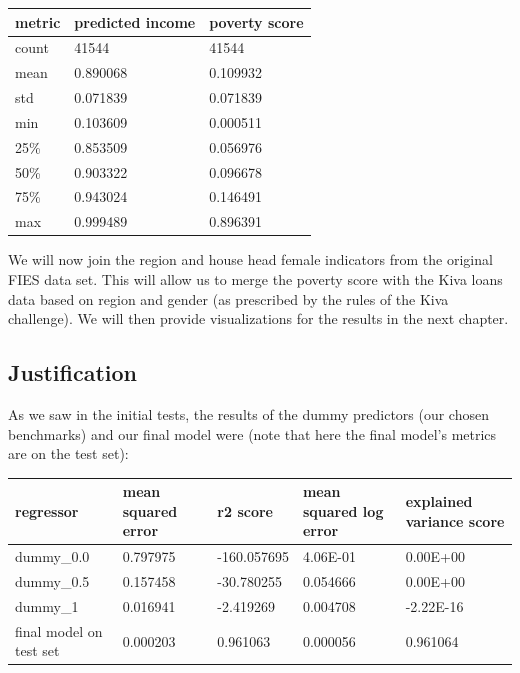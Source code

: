 \documentclass{article}
\begin{document}
\begin{center}
\begin{tabular}{ |l|l|l| }
  \hline
  metric &  predicted income & poverty score\\
  \hline
  count & 41544 & 41544\\
  mean & 0.890068 & 0.109932\\
  std & 0.071839 & 0.071839\\
  min & 0.103609 & 0.000511\\
  25\% & 0.853509 & 0.056976\\
  50\% & 0.903322 & 0.096678\\
  75\% & 0.943024 & 0.146491\\
  max & 0.999489 & 0.896391\\
  \hline
\end{tabular}
\end{center}

We will now join the region and house head female indicators from the original FIES data set. This will allow us to merge the poverty score with the Kiva loans data based on region and gender (as prescribed by the rules of the Kiva challenge). We will then provide visualizations for the results in the next chapter.

\subsection{Justification}

As we saw in the initial tests, the results of the dummy predictors (our chosen benchmarks) and our final model were (note that here the final model's metrics are on the test set):

\begin{center}
\begin{tabular}{ |l|l|l|l|l| }
  \hline
  regressor & mean squared error & r2 score & mean squared log error & explained variance score\\
  \hline
  dummy\_0.0 & 0.797975 & -160.057695 & 4.06E-01 & 0.00E+00\\
  dummy\_0.5 & 0.157458 & -30.780255 & 0.054666 & 0.00E+00\\
  dummy\_1 & 0.016941 & -2.419269 & 0.004708 & -2.22E-16\\
  final model on test set & 0.000203 & 0.961063 & 0.000056 & 0.961064\\
  \hline
\end{tabular}
\end{center}
\end{document}
